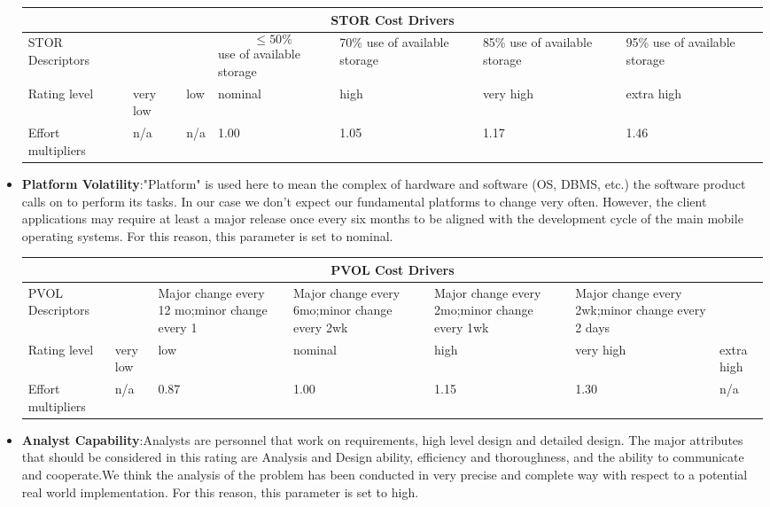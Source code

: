 \begin{itemize}
\begin{longtable}{| m{}| m{} | m{} | m{} | m{} | m{} | m{}| }
\hline
\multicolumn{7}{c}{STOR Cost Drivers}\\
\hline
\hline
STOR Descriptors &  &  & \begin{equation*}
{\le 50\%} 
\end{equation*} use of available storage& 70\% use of available storage & 85\% use of available storage & 95\% use of available storage \\
\hline
Rating level & very low & low & nominal & high & very high & extra high \\
\hline
Effort multipliers & n/a & n/a & 1.00 & 1.05 & 1.17 & 1.46 \\
\hline
\end{longtable}

\item \textbf{Platform Volatility}:"Platform" is used here to mean the complex of hardware and software (OS, DBMS, etc.) the software product calls on to perform its tasks. In our case we don’t expect our fundamental platforms to change very often. However, the client applications may require at least a major release once every six months to be aligned with the development cycle of the main mobile operating systems. For this reason, this parameter is set to nominal.

\begin{longtable}{| m{}| m{} | m{} | m{} | m{} | m{} | m{}| }
\hline
\multicolumn{7}{c}{PVOL Cost Drivers}\\
\hline
\hline
PVOL Descriptors &  & Major change every 12 mo;minor change every 1 & Major change every 6mo;minor change every 2wk & Major change every 2mo;minor change every 1wk & Major change every 2wk;minor change every 2 days & \\
\hline
Rating level & very low & low & nominal & high & very high & extra high \\
\hline
Effort multipliers & n/a & 0.87 & 1.00 & 1.15 & 1.30 & n/a \\
\hline
\end{longtable}

\item\textbf{Analyst Capability}:Analysts are personnel that work on requirements, high level design and detailed design. The major attributes that should be considered in this rating are Analysis and Design ability, efficiency and thoroughness, and the ability to communicate and cooperate.We think the analysis of the problem has been conducted in very precise and complete way with respect to a potential real world
implementation. For this reason, this parameter is set to high.


\end{itemize}
